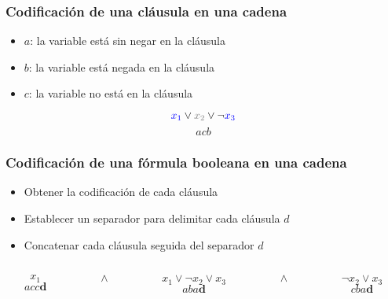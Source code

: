 \documentclass{beamer}
\begin{document}
\begin{frame}
    \frametitle{Codificación de una cláusula en una cadena}
    
    \begin{itemize}
        \item $a$: la variable está sin negar en la cláusula
              \pause
        \item $b$: la variable está negada en la cláusula
              \pause
        \item $c$: la variable no está en la cláusula
    \end{itemize}
    
    \pause
    
    \begin{Large}

        $$\textcolor{blue}{x_1}\vee \textcolor{gray}{x_2}\vee \neg \textcolor{blue}{x_3}$$$$acb$$
        
    \end{Large}
    
\end{frame}

\begin{frame}
    \frametitle{Codificación de una fórmula booleana en una cadena}
    
    \begin{itemize}
        \item Obtener la codificación de cada cláusula
              \pause
        \item Establecer un separador para delimitar cada cláusula $d$
              \pause
        \item Concatenar cada cláusula seguida del separador $d$
    \end{itemize}
    \pause
    \vspace{1cm}
    
    \begin{Large}
        \begin{columns}
            \begin{column}{1cm}
                $$x_1$$
                $$acc\mathbf{d}$$
            \end{column}
            \pause
            \begin{column}{0.2cm}
                $$\wedge$$
                $$\ $$
            \end{column}
            \begin{column}{3cm}
                $$x_1\vee \neg x_2 \vee x_3$$
                $$aba\mathbf{d}$$
            \end{column}
            \pause
            \begin{column}{0.2cm}
                $$\wedge$$
                $$\ $$
            \end{column}
            \begin{column}{2cm}
                $$\neg x_2\vee x_3$$
                $$cba\mathbf{d}$$
            \end{column}
        \end{columns}
        
    \end{Large}
\end{frame}
\end{document}
